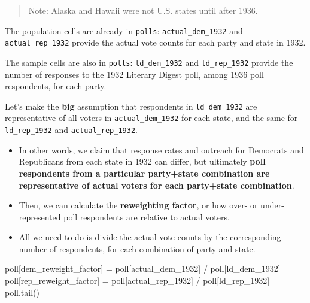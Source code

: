 \documentclass[
  letterpaper,
  DIV=11,
  numbers=noendperiod]{scrreprt}
\newenvironment{Shaded}{\begin{snugshade}}{\end{snugshade}}
\newcommand{\NormalTok}[1]{\textcolor[rgb]{0.00,0.23,0.31}{#1}}
\newcommand{\OperatorTok}[1]{\textcolor[rgb]{0.37,0.37,0.37}{#1}}
\newcommand{\StringTok}[1]{\textcolor[rgb]{0.13,0.47,0.30}{#1}}
\begin{document}
\begin{quote}
Note: Alaska and Hawaii were not U.S. states until after 1936.
\end{quote}

The population cells are already in \texttt{polls}:
\texttt{actual\_dem\_1932} and \texttt{actual\_rep\_1932} provide the
actual vote counts for each party and state in 1932.

The sample cells are also in \texttt{polls}: \texttt{ld\_dem\_1932} and
\texttt{ld\_rep\_1932} provide the number of responses to the 1932
Literary Digest poll, among 1936 poll respondents, for each party.

Let's make the \textbf{big} assumption that respondents in
\texttt{ld\_dem\_1932} are representative of all voters in
\texttt{actual\_dem\_1932} for each state, and the same for
\texttt{ld\_rep\_1932} and \texttt{actual\_rep\_1932}.

\begin{itemize}
\item
  In other words, we claim that response rates and outreach for
  Democrats and Republicans from each state in 1932 can differ, but
  ultimately \textbf{poll respondents from a particular party+state
  combination are representative of actual voters for each party+state
  combination}.
\item
  Then, we can calculate the \textbf{reweighting factor}, or how over-
  or under-represented poll respondents are relative to actual voters.
\item
  All we need to do is divide the actual vote counts by the
  corresponding number of respondents, for each combination of party and
  state.
\end{itemize}

\begin{Shaded}
\begin{Highlighting}[]
\NormalTok{poll[}\StringTok{\textquotesingle{}dem\_reweight\_factor\textquotesingle{}}\NormalTok{] }\OperatorTok{=}\NormalTok{ poll[}\StringTok{\textquotesingle{}actual\_dem\_1932\textquotesingle{}}\NormalTok{] }\OperatorTok{/}\NormalTok{ poll[}\StringTok{\textquotesingle{}ld\_dem\_1932\textquotesingle{}}\NormalTok{]}
\NormalTok{poll[}\StringTok{\textquotesingle{}rep\_reweight\_factor\textquotesingle{}}\NormalTok{] }\OperatorTok{=}\NormalTok{ poll[}\StringTok{\textquotesingle{}actual\_rep\_1932\textquotesingle{}}\NormalTok{] }\OperatorTok{/}\NormalTok{ poll[}\StringTok{\textquotesingle{}ld\_rep\_1932\textquotesingle{}}\NormalTok{]}
\NormalTok{poll.tail()}
\end{Highlighting}
\end{Shaded}
\end{document}
